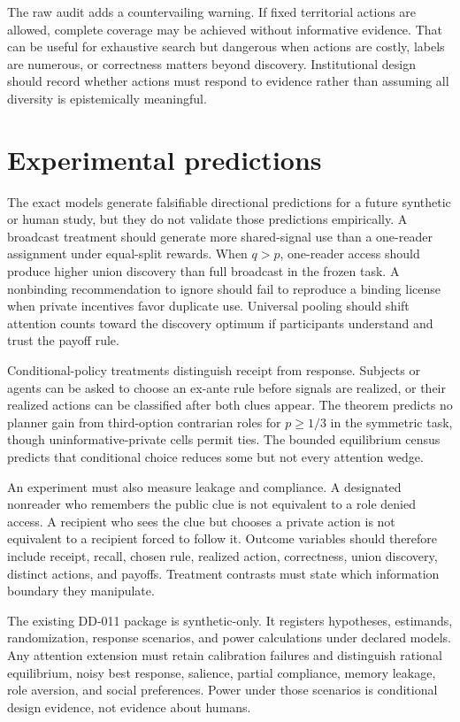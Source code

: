 \documentclass[11pt]{article}
\begin{document}
The raw audit adds a countervailing warning. If fixed territorial actions are
allowed, complete coverage may be achieved without informative evidence. That
can be useful for exhaustive search but dangerous when actions are costly,
labels are numerous, or correctness matters beyond discovery. Institutional
design should record whether actions must respond to evidence rather than
assuming all diversity is epistemically meaningful.

\section{Experimental predictions}

The exact models generate falsifiable directional predictions for a future
synthetic or human study, but they do not validate those predictions empirically.
A broadcast treatment should generate more shared-signal use than a one-reader
assignment under equal-split rewards. When $q>p$, one-reader access should
produce higher union discovery than full broadcast in the frozen task. A
nonbinding recommendation to ignore should fail to reproduce a binding license
when private incentives favor duplicate use. Universal pooling should shift
attention counts toward the discovery optimum if participants understand and
trust the payoff rule.

Conditional-policy treatments distinguish receipt from response. Subjects or
agents can be asked to choose an ex-ante rule before signals are realized, or
their realized actions can be classified after both clues appear. The theorem
predicts no planner gain from third-option contrarian roles for $p\geq1/3$ in
the symmetric task, though uninformative-private cells permit ties. The bounded
equilibrium census predicts that conditional choice reduces some but not every
attention wedge.

An experiment must also measure leakage and compliance. A designated nonreader
who remembers the public clue is not equivalent to a role denied access. A
recipient who sees the clue but chooses a private action is not equivalent to a
recipient forced to follow it. Outcome variables should therefore include
receipt, recall, chosen rule, realized action, correctness, union discovery,
distinct actions, and payoffs. Treatment contrasts must state which information
boundary they manipulate.

The existing DD-011 package is synthetic-only. It registers hypotheses,
estimands, randomization, response scenarios, and power calculations under
declared models. Any attention extension must retain calibration failures and
distinguish rational equilibrium, noisy best response, salience, partial
compliance, memory leakage, role aversion, and social preferences. Power under
those scenarios is conditional design evidence, not evidence about humans.
\end{document}
